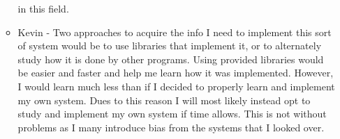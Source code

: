 \begin{enumerate}
\begin{itemize}
        in this field.
        \item Kevin - Two approaches to acquire the info I need to implement 
        this sort of system would be to use libraries that implement it, or to 
        alternately study how it is done by other programs. Using provided 
        libraries would be easier and faster and help me learn how it was 
        implemented. However, I would learn much less than if I decided to 
        properly learn and implement my own system. Dues to this reason I will 
        most likely instead opt to study and implement my own system if time 
        allows. This is not without problems as I many introduce bias from the 
        systems that I looked over.
  \end{itemize} 
\end{enumerate}
